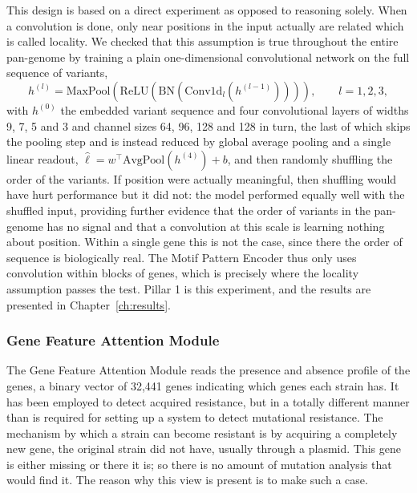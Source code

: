 This design is based on a direct experiment as opposed to reasoning solely. When a
convolution is done, only near positions in the input actually are related which is called
locality. We checked that this assumption is true throughout the entire pan-genome by
training a plain one-dimensional convolutional network on the full sequence of variants,
\begin{equation}
h^{(l)} = \mathrm{MaxPool}\!\left(\mathrm{ReLU}\!\left(\mathrm{BN}\!\left(\mathrm{Conv1d}_l\!\left(h^{(l-1)}\right)\right)\right)\right),
\qquad l = 1, 2, 3,
\label{eq:naive_cnn}
\end{equation}
with $h^{(0)}$ the embedded variant sequence and four convolutional layers of widths 9, 7, 5
and 3 and channel sizes 64, 96, 128 and 128 in turn, the last of which skips the pooling step
and is instead reduced by global average pooling and a single linear readout,
$\hat{\ell} = w^\top \mathrm{AvgPool}(h^{(4)}) + b$, and then randomly shuffling the order
of the variants. If position were actually meaningful, then shuffling would have hurt performance but it did
not: the model performed equally well with the shuffled input, providing further evidence that
the order of variants in the pan-genome has no signal and that a convolution at this scale is
learning nothing about position. Within a single gene this is not the case, since there the
order of sequence is biologically real. The Motif Pattern Encoder thus only uses convolution
within blocks of genes, which is precisely where the locality assumption passes the test.
Pillar 1 is this experiment, and the results are presented in Chapter~\ref{ch:results}.

\subsubsection{Gene Feature Attention Module}
\label{subsec:lensB}

The Gene Feature Attention Module reads the presence and absence profile of the genes, a
binary vector of 32{,}441 genes indicating which genes each strain has. It has been employed to
detect acquired resistance, but in a totally different manner than is required for setting up
a system to detect mutational resistance. The mechanism by which a strain can become resistant is by acquiring a
completely new gene, the original strain did not have, usually through a plasmid. This gene
is either missing or there it is; so there is no amount of mutation analysis that would find
it. The reason why this view is present is to make such a case.

